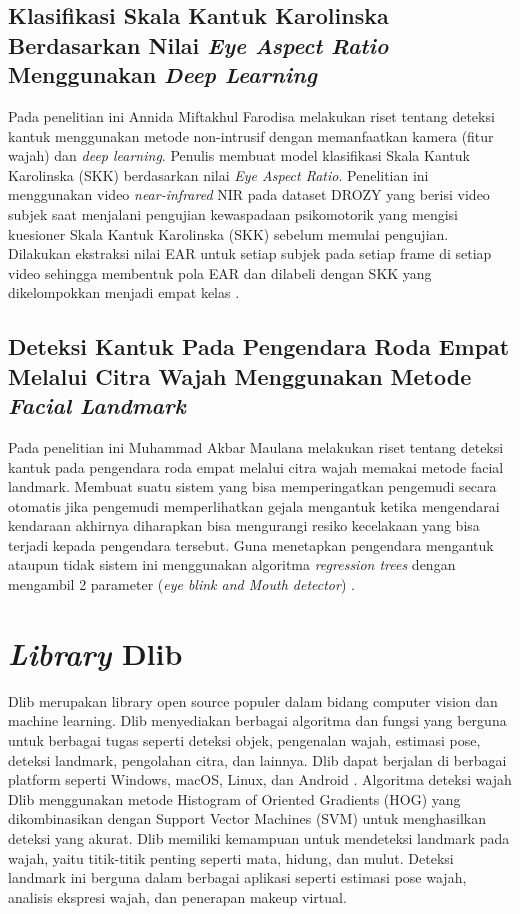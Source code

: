 \subsection{Klasifikasi Skala Kantuk Karolinska Berdasarkan Nilai \emph{Eye Aspect Ratio} Menggunakan \emph{Deep Learning}}
Pada penelitian ini Annida Miftakhul Farodisa melakukan riset tentang deteksi kantuk menggunakan metode non-intrusif
dengan memanfaatkan kamera (fitur wajah) dan \emph{deep learning}. Penulis membuat model klasifikasi Skala Kantuk Karolinska
(SKK) berdasarkan nilai \emph{Eye Aspect Ratio}. Penelitian ini menggunakan video \emph{near-infrared} NIR pada dataset DROZY yang berisi video
subjek saat menjalani pengujian kewaspadaan psikomotorik yang mengisi kuesioner Skala Kantuk Karolinska (SKK) sebelum
memulai pengujian. Dilakukan ekstraksi nilai EAR untuk setiap subjek pada setiap frame di setiap video sehingga
membentuk pola EAR dan dilabeli dengan SKK yang dikelompokkan menjadi empat kelas \parencite{11}.

\subsection{Deteksi Kantuk Pada Pengendara Roda Empat Melalui Citra Wajah Menggunakan Metode \emph{Facial Landmark}}
Pada penelitian ini Muhammad Akbar Maulana melakukan riset tentang deteksi kantuk pada pengendara roda empat melalui
citra wajah memakai metode facial landmark. Membuat suatu sistem yang bisa memperingatkan pengemudi secara otomatis
jika pengemudi memperlihatkan gejala mengantuk ketika mengendarai kendaraan akhirnya diharapkan bisa mengurangi
resiko kecelakaan yang bisa terjadi kepada pengendara tersebut. Guna menetapkan pengendara mengantuk ataupun tidak
sistem ini menggunakan algoritma \emph{regression trees} dengan mengambil 2 parameter (\emph{eye blink and Mouth detector}) \parencite{12}.

\section{\emph{Library} Dlib}

Dlib merupakan library open source populer dalam bidang computer vision dan
machine learning. Dlib menyediakan berbagai algoritma dan fungsi yang berguna untuk
berbagai tugas seperti deteksi objek, pengenalan wajah, estimasi pose, deteksi landmark,
pengolahan citra, dan lainnya. Dlib dapat berjalan di berbagai platform seperti Windows,
macOS, Linux, dan Android \parencite{14}. Algoritma deteksi wajah Dlib menggunakan
metode Histogram of Oriented Gradients (HOG) yang dikombinasikan dengan Support Vector
Machines (SVM) untuk menghasilkan deteksi yang akurat. Dlib memiliki kemampuan untuk mendeteksi landmark pada wajah,
yaitu titik-titik penting seperti mata, hidung, dan mulut. Deteksi landmark ini berguna
dalam berbagai aplikasi seperti estimasi pose wajah, analisis ekspresi wajah, dan
penerapan makeup virtual.

